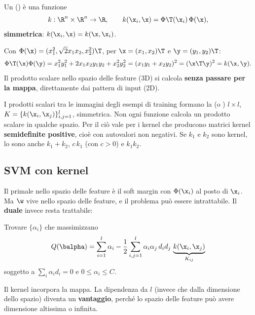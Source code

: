 \begin{definizione}[Kernel]
Un  () è una funzione
\[
k:\R^{n}\times\R^{n}\to\R,\qquad k(\x_i,\x) = \Phi\T(\x_i)\,\Phi(\x),
\]
\textbf{simmetrica}: $k(\x_i,\x) = k(\x,\x_i)$.
\end{definizione}

\begin{esempio}
Con $\Phi(\x) = (x_1^2,\sqrt2x_1x_2,x_2^2)\T$, per $\x = (x_1,x_2)\T$ e $\y = (y_1,y_2)\T$:
\[
\Phi\T(\x)\Phi(\y) = x_1^2y_1^2 + 2x_1x_2y_1y_2 + x_2^2y_2^2 = (x_1y_1+x_2y_2)^2 = (\x\T\y)^2 = k(\x,\y).
\]
Il prodotto scalare nello spazio delle feature (3D) si calcola \textbf{senza passare per la mappa}, direttamente
dai pattern di input (2D).
\end{esempio}

I prodotti scalari tra le immagini degli esempi di training formano la  (o ) $l\times l$, $K = \{k(\x_i,\x_j)\}_{i,j=1}^l$, simmetrica. Non ogni funzione calcola un prodotto scalare in
qualche spazio. Per il  ciò vale per i kernel che producono matrici kernel
\textbf{semidefinite positive}, cioè con autovalori non negativi. Se $k_1$ e $k_2$ sono kernel, lo sono anche
$k_1+k_2$, $c\,k_1$ (con $c>0$) e $k_1k_2$.

\subsection{SVM con kernel}

Il primale nello spazio delle feature è il soft margin con $\Phi(\x_i)$ al posto di $\x_i$. Ma $\w$ vive nello
spazio delle feature, e il problema può essere intrattabile. Il \textbf{duale} invece resta trattabile:

\begin{definizione}
Trovare $\{\alpha_i\}$ che massimizzano
\[
Q(\balpha) = \sum_{i=1}^{l}\alpha_i - \frac12\sum_{i,j=1}^{l}\alpha_i\alpha_j\,d_id_j\,\underbrace{k(\x_i,\x_j)}_{K_{ij}}
\]
soggetto a $\sum_i\alpha_id_i = 0$ e $0\le\alpha_i\le C$.
\end{definizione}

Il kernel incorpora la mappa. La dipendenza da $l$ (invece che dalla dimensione dello spazio) diventa un
\textbf{vantaggio}, perché lo spazio delle feature può avere dimensione altissima o infinita.

